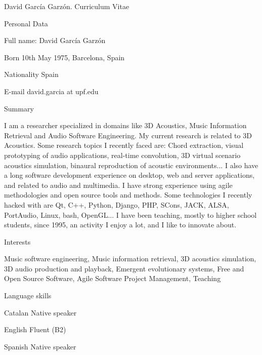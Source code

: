 \documentclass{article}
\begin{document}
\setlength{\cvlabelwidth}{45mm}

\begin{cv}{David García Garzón. Curriculum Vitae}

\begin{cvlist}{Personal Data}
\item[Full name:] David García Garzón
\item[Born] 10th May 1975, Barcelona, Spain
\item[Nationality] Spain
\item[E-mail] david.garcia at upf.edu
\end{cvlist}

\begin{cvlist}{Summary}
\item[] I am a researcher specialized in domains like 3D Acoustics, Music Information Retrieval and Audio Software Engineering.
My current research is related to 3D Acoustics.
Some research topics I recently faced are:
Chord extraction,
visual prototyping of audio applications,
real-time convolution,
3D virtual scenario acoustics simulation,
binaural reproduction of acoustic environments...
I also have a long software development experience on desktop, web and server applications, and related to audio and multimedia.
I have strong experience using agile methodologies and open source tools and methods.
Some technologies I recently hacked with are Qt, C++, Python, Django, PHP, SCons, JACK, ALSA, PortAudio, Linux, bash, OpenGL...
I have been teaching, mostly to higher school students, since 1995,
an activity I enjoy a lot, and I like to innovate about.

\end{cvlist}

\begin{cvlist}{Interests}
\item[] Music software engineering, Music information retrieval, 3D acoustics simulation, 3D audio production and playback, Emergent evolutionary systems, Free and Open Source Software, Agile Software Project Management, Teaching
\end{cvlist}



\begin{cvlist}{Language skills}
\item[Catalan] Native speaker
\item[English] Fluent (B2)
\item[Spanish] Native speaker


\end{cvlist}
\end{cv}
\end{document}
